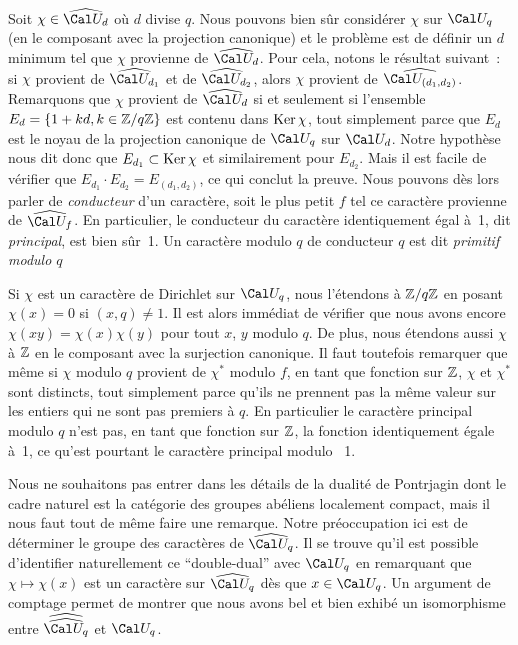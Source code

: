 Soit $\chi\in\widehat{\Cal U_d}$ o\`u $d$ divise $q$. Nous pouvons bien
s\^ur consid\'erer $\chi$ sur $\Cal U_q$ (en le composant avec la
projection canonique) et le probl\`eme est de d\'efinir un $d$ minimum
tel que $\chi$ provienne de $\widehat{\Cal U_d}$. Pour cela, notons le
r\'esultat suivant~: si $\chi$ provient de $\widehat{\Cal U_{d_1}}$ et de
$\widehat{\Cal U_{d_2}}$, alors $\chi$ provient de $\widehat{\Cal
U_{(d_1,d_2)}}$.
Remarquons que $\chi$ provient de $\widehat{\Cal U_d}$ si et seulement si
l'ensemble $E_d=\{1+kd, k\in\Bbb Z/q\Bbb Z\}$ est contenu dans
$\Ker\chi$, tout simplement parce que $E_d$ est le noyau de la
projection canonique de $\Cal U_q$ sur $\Cal U_d$. Notre hypoth\`ese
nous dit donc que
$E_{d_1}\subset\Ker\chi$ et similairement pour $E_{d_2}$.
Mais il est facile de v\'erifier que $E_{d_1}\cdot E_{d_2}=E_{(d_1,d_2)}$,
ce qui conclut la preuve.
\fin
Nous pouvons d\`es lors parler de {\it conducteur} d'un caract\`ere,
soit le plus petit $f$ tel ce caract\`ere provienne de $\widehat{\Cal U_f}$.
En particulier, le conducteur du caract\`ere identiquement \'egal
\`a~1, dit {\it principal}, est bien s\^ur~1.
Un caract\`ere modulo $q$ de
conducteur $q$ est dit {\it primitif modulo $q$}

Si $\chi$ est un caract\`ere de Dirichlet sur $\Cal U_q$, nous
l'\'etendons \`a $\Bbb Z/q\Bbb Z$ en posant $\chi(x)=0$ si
$(x,q)\neq1$. Il est alors imm\'ediat de v\'erifier que nous avons
encore $\chi(xy)=\chi(x)\chi(y)$ pour tout $x$, $y$ modulo $q$.
De plus, nous \'etendons aussi $\chi$ \`a $\Bbb Z$ en le composant
avec la surjection canonique. Il faut toutefois remarquer que m\^eme
si $\chi$ modulo $q$ provient de $\chi^*$ modulo $f$, en tant que
fonction sur $\Bbb Z$, $\chi$ et $\chi^*$ sont distincts, tout
simplement parce qu'ils ne prennent pas la m\^eme valeur sur les
entiers qui ne sont pas premiers \`a $q$. En particulier le
caract\`ere principal modulo $q$ n'est pas, en tant que fonction sur
$\Bbb Z$, la fonction identiquement \'egale \`a~1, ce qu'est pourtant
le caract\`ere principal modulo ~1.

Nous ne souhaitons pas entrer dans les d\'etails de la dualit\'e de
Pontrjagin dont le cadre naturel est la cat\'egorie des groupes
ab\'eliens localement compact, mais il nous faut tout de m\^eme faire
une remarque. Notre pr\'eoccupation ici est de d\'eterminer le groupe
des caract\`eres de $\widehat{\Cal U_q}$. Il se trouve qu'il est
possible d'identifier naturellement ce ``double-dual'' avec $\Cal U_q$
en remarquant que $\chi\mapsto\chi(x)$ est un caract\`ere sur
$\widehat{\Cal U_q}$ d\`es que $x\in\Cal U_q$. Un argument de comptage
permet de montrer que nous avons bel et bien exhib\'e un isomorphisme
entre $\widehat{\widehat{\Cal U_q}}$ et $\Cal U_q$.

